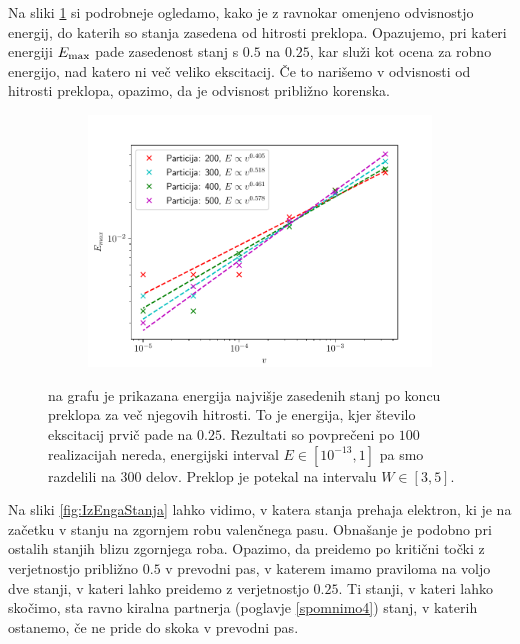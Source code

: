 \newpage
Na sliki \ref{fig:Emax} si podrobneje ogledamo, kako je z ravnokar omenjeno odvisnostjo energij, do katerih so stanja zasedena od hitrosti preklopa. Opazujemo, pri kateri energiji $E_{\textup{max}}$ pade zasedenost stanj s $0.5$ na $0.25$, kar služi kot ocena za robno energijo, nad katero ni več veliko ekscitacij. Če to narišemo v odvisnosti od hitrosti preklopa, opazimo, da je odvisnost približno korenska.
\begin{figure}[!h]
\centering
\begin{subfigure}{.9\textwidth}
\includegraphics[width=\linewidth]{Figures/Emax.pdf}
\end{subfigure}
\caption{na grafu je prikazana energija najvišje zasedenih stanj po koncu preklopa za več njegovih hitrosti. To je energija, kjer število ekscitacij prvič pade na $0.25$. Rezultati so povprečeni po $100$ realizacijah nereda, energijski interval $E \in [10^{-13},1]$ pa smo razdelili na $300$ delov. Preklop je potekal na intervalu $W \in [3,5]$.}
\label{fig:Emax}
\end{figure}
\newpage
Na sliki \ref{fig:IzEngaStanja} lahko vidimo, v katera stanja prehaja elektron, ki je na začetku v  stanju na zgornjem robu valenčnega pasu. Obnašanje je podobno pri ostalih stanjih blizu zgornjega roba. Opazimo, da preidemo po kritični točki z verjetnostjo približno $0.5$ v prevodni pas, v katerem imamo praviloma na voljo dve stanji, v kateri lahko preidemo z verjetnostjo $0.25$. Ti stanji, v kateri lahko skočimo, sta ravno kiralna partnerja (poglavje \ref{spomnimo4}) stanj, v katerih ostanemo, če ne pride do skoka v prevodni pas.  
